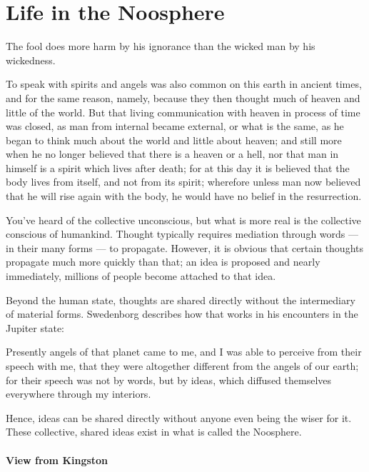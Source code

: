 \section{Life in the Noosphere}

\begin{quotex}
The fool does more harm by his ignorance than the wicked man by his wickedness.

To speak with spirits and angels was also common on this earth in ancient times, and for the same reason, namely, because they then thought much of heaven and little of the world. But that living communication with heaven in process of time was closed, as man from internal became external, or what is the same, as he began to think much about the world and little about heaven; and still more when he no longer believed that there is a heaven or a hell, nor that man in himself is a spirit which lives after death; for at this day it is believed that the body lives from itself, and not from its spirit; wherefore unless man now believed that he will rise again with the body, he would have no belief in the resurrection.
\end{quotex}


You've heard of the collective unconscious, but what is more real is the collective conscious of humankind. Thought typically requires mediation through words --- in their many forms --- to propagate. However, it is obvious that certain thoughts propagate much more quickly than that; an idea is proposed and nearly immediately, millions of people become attached to that idea.

Beyond the human state, thoughts are shared directly without the intermediary of material forms. Swedenborg describes how that works in his encounters in the Jupiter state:

Presently angels of that planet came to me, and I was able to perceive from their speech with me, that they were altogether different from the angels of our earth; for their speech was not by words, but by ideas, which diffused themselves everywhere through my interiors.

Hence, ideas can be shared directly without anyone even being the wiser for it. These collective, shared ideas exist in what is called the Noosphere.

\paragraph{View from Kingston}


